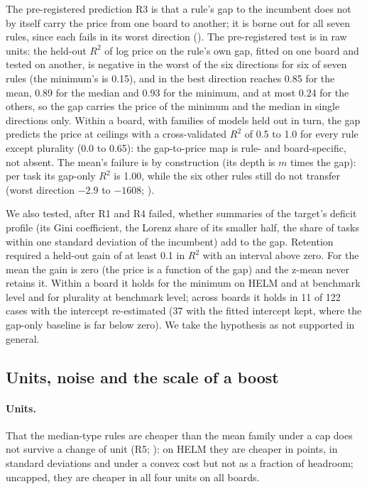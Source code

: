 The pre-registered prediction R3 is that a rule's gap to the incumbent does not by itself carry the price from one board to another; it is borne out for all seven rules, since each fails in its worst direction (). The pre-registered test is in raw units: the held-out $R^2$ of log price on the rule's own gap, fitted on one board and tested on another, is negative in the worst of the six directions for six of seven rules (the minimum's is 0.15), and in the best direction reaches 0.85 for the mean, 0.89 for the median and 0.93 for the minimum, and at most 0.24 for the others, so the gap carries the price of the minimum and the median in single directions only. Within a board, with families of models held out in turn, the gap predicts the price at ceilings with a cross-validated $R^2$ of 0.5 to 1.0 for every rule except plurality (0.0 to 0.65): the gap-to-price map is rule- and board-specific, not absent. The mean's failure is by construction (its depth is $m$ times the gap): per task its gap-only $R^2$ is 1.00, while the six other rules still do not transfer (worst direction $-2.9$ to $-1608$; ).

We also tested, after R1 and R4 failed, whether summaries of the target's deficit profile (its Gini coefficient, the Lorenz share of its smaller half, the share of tasks within one standard deviation of the incumbent) add to the gap. Retention required a held-out gain of at least 0.1 in $R^2$ with an interval above zero. For the mean the gain is zero (the price is a function of the gap) and the z-mean never retains it. Within a board it holds for the minimum on HELM and at benchmark level and for plurality at benchmark level; across boards it holds in 11 of 122 cases with the intercept re-estimated (37 with the fitted intercept kept, where the gap-only baseline is far below zero). We take the hypothesis as not supported in general.

\subsection{Units, noise and the scale of a boost}
\label{sec:robustness}

\paragraph{Units.}
That the median-type rules are cheaper than the mean family under a cap does not survive a change of unit (R5; ): on HELM they are cheaper in points, in standard deviations and under a convex cost but not as a fraction of headroom; uncapped, they are cheaper in all four units on all boards.

